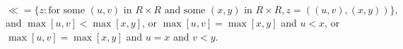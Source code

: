 $$\ll = \{z: \text{for some } (u,v) \text{ in } R \times R \text{ and some } (x,y) \text{ in } R \times R, z = ((u,v),(x,y))\},$$ and $\max [u,v] < \max [x,y]$, or $\max [u,v] = \max [x,y]$ and $u < x$, or $\max [u,v] = \max [x,y]$ and $u = x$ and $v < y$.
